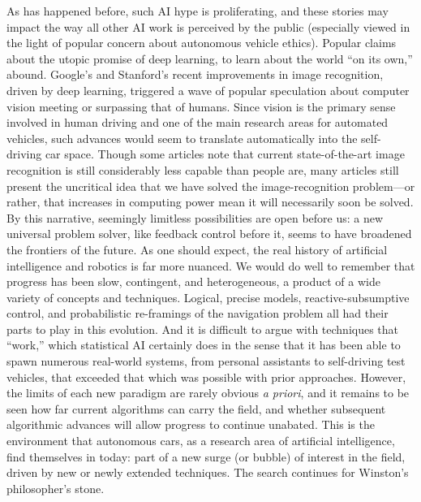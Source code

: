 As has happened before, such AI hype is proliferating, and these
stories may impact the way all other AI work is
perceived by the public (especially viewed in the light of
popular concern about autonomous vehicle ethics). Popular claims
about the utopic promise of deep learning, to
learn about the world ``on its own,''
abound. Google's and Stanford's recent
improvements in image recognition, driven by deep learning,
\cite{markoffImage} triggered a wave 
of popular speculation about computer vision meeting or surpassing
that of humans. Since vision is the primary sense involved in human driving
and one of the main research areas for automated vehicles, such
advances would seem to translate automatically into the self-driving
car space. Though some articles note that current
state-of-the-art image recognition is still considerably less capable
than people are, many articles still present the uncritical idea that we have solved
the image-recognition problem---or rather, that increases in computing
power mean it will necessarily soon be solved. By this narrative, seemingly limitless
possibilities are open before us: a new universal problem solver, like
feedback control before it, seems to have broadened the frontiers
of the future. As one should expect, the real
history of artificial intelligence and robotics is far more nuanced.
We would do well to remember that 
progress has been slow, contingent, and heterogeneous, a product of a
wide variety of concepts and techniques. Logical, precise models,
reactive-subsumptive control, and probabilistic re-framings of the
navigation problem all had their parts to play in this evolution. And
it is difficult to argue with techniques that ``work,'' which
statistical AI certainly does in the sense that it has been able to
spawn numerous real-world systems, from personal assistants to
self-driving test vehicles, that exceeded that which was possible with
prior approaches. However, the limits of each new paradigm are rarely
obvious \emph{a priori}, and it remains to be seen how far current
algorithms can carry the field, and whether subsequent algorithmic
advances will allow progress to continue unabated. This is the
environment that autonomous cars, as a 
research area of artificial intelligence, find themselves in today:
part of a new surge (or bubble) of interest in the field, driven by new
or newly extended techniques. The search continues for Winston's
philosopher's stone.


